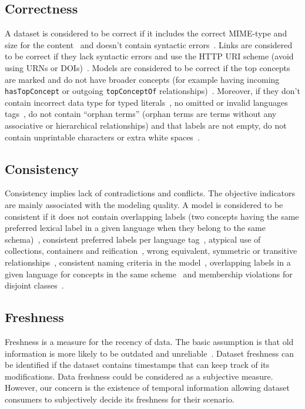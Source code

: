\subsection{Correctness}
A dataset is considered to be correct if it includes the correct MIME-type and size for the content~\cite{Hogan:LDOW:10} and doesn't contain syntactic errors~\cite{Hogan:LDOW:10}. Links are considered to be correct if they lack syntactic errors and use the HTTP URI scheme (avoid using URNs or DOIs)~\cite{Mader:TBDL:12}. Models are considered to be correct if the top concepts are marked and do not have broader concepts (for example having incoming \texttt{hasTopConcept} or outgoing \texttt{topConceptOf} relationships)~\cite{Mader:TBDL:12}. Moreover, if they don't contain incorrect data type for typed literals~\cite{Hogan:LDOW:10}\cite{Acosta:ISWC:13}, no omitted or invalid languages tags~\cite{Suominen:IKEM:12,Mader:TBDL:12}, do not contain ``orphan terms'' (orphan terms are terms without any associative or hierarchical relationships) and that labels are not empty, do not contain unprintable characters or extra white spaces~\cite{Suominen:IKEM:12,Acosta:ISWC:13,Mader:TBDL:12}.

\subsection{Consistency}
Consistency implies lack of contradictions and conflicts. The objective indicators are mainly associated with the modeling quality. A model is considered to be consistent if it does not contain overlapping labels (two concepts having the same preferred lexical label in a given language when they belong to the same schema)~\cite{Isaac:W3C:09,Mader:TBDL:12}, consistent preferred labels per language tag~\cite{Mader:TBDL:12,Suominen:IKEM:12}, atypical use of collections, containers and reification~\cite{Hogan:LDOW:10}, wrong equivalent, symmetric or transitive relationships~\cite{Maria:KEOD:13}, consistent naming criteria in the model~\cite{Mader:TBDL:12,Maria:KEOD:13}, overlapping labels in a given language for concepts in the same scheme~\cite{Mader:TBDL:12} and membership violations for disjoint classes~\cite{Hogan:LDOW:10,Maria:KEOD:13}.

\subsection{Freshness}
Freshness is a measure for the recency of data. The basic assumption is that old information is more likely to be outdated and unreliable~\cite{Flouris:EvoDyn:12}. Dataset freshness can be identified if the dataset contains timestamps that can keep track of its modifications. Data freshness could be considered as a subjective measure. However, our concern is the existence of temporal information allowing dataset consumers to subjectively decide its freshness for their scenario.

